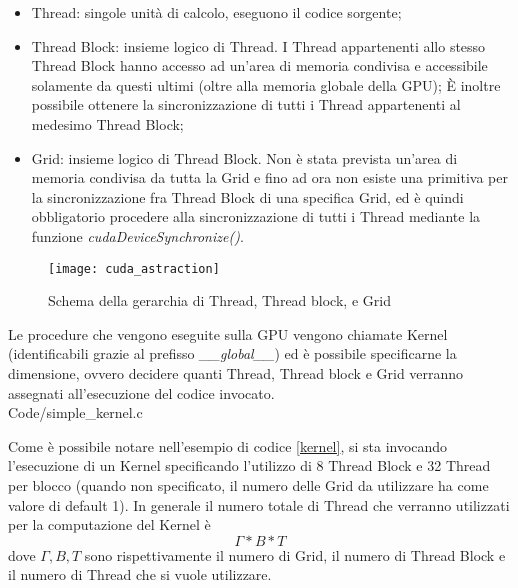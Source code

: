\begin{itemize}
    \item
        Thread: singole unità di calcolo, eseguono il codice sorgente;
    \item
        Thread Block: insieme logico di Thread.
        I Thread appartenenti
        allo stesso Thread Block hanno accesso ad un'area di memoria
        condivisa e accessibile solamente da questi ultimi
        (oltre alla memoria globale della GPU);
        È inoltre possibile ottenere la sincronizzazione di tutti i
        Thread appartenenti al medesimo Thread Block;
    \item
        Grid: insieme logico di Thread Block. Non è stata
        prevista un'area di memoria condivisa da tutta la Grid
        e fino ad ora non esiste una primitiva per la sincronizzazione fra
        Thread Block di una specifica Grid, ed è quindi
        obbligatorio procedere alla sincronizzazione di tutti i Thread
        mediante la funzione \textit{cudaDeviceSynchronize()}.
\end{itemize}

\begin{figure}[H]
    \centering
    \texttt{[image: cuda\_astraction]}
    \caption{Schema della gerarchia di Thread, Thread block, e Grid 
        \cite{nickolls2010gpu}}
\end{figure}

Le procedure che vengono eseguite sulla GPU vengono chiamate Kernel
(identificabili grazie al prefisso \textit{\_\_global\_\_})
ed è possibile specificarne la dimensione, ovvero decidere quanti
Thread, Thread block e Grid verranno assegnati
all'esecuzione del codice invocato.
\\

    {Code/simple_kernel.c}

Come è possibile notare nell'esempio di codice \ref{kernel}, si sta invocando
l'esecuzione di un Kernel specificando l'utilizzo di 8 Thread Block e
32 Thread per blocco (quando non specificato, il numero delle
Grid da utilizzare ha come valore di default 1). In generale il numero totale di
Thread che verranno utilizzati per la computazione del Kernel è
$$\Gamma * B * T$$ dove $\Gamma, B, T$
sono rispettivamente
il numero di Grid, il numero di Thread Block e il numero
di Thread che si vuole utilizzare.

